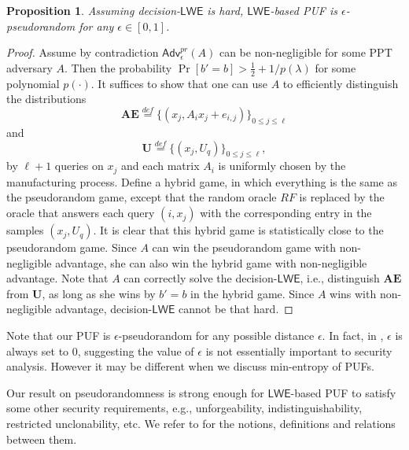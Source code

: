 \documentclass[12pt]{article}
\newcommand{\eqdef}{\stackrel{def}{=}}
\newcommand{\Adv}{\mathsf{Adv}}
\newcommand{\LWE}{\mathsf{LWE}}
\newtheorem{proposition}[theorem]{Proposition}
\theoremstyle{definition}
\begin{document}
\begin{proposition}
Assuming decision-$\LWE$ is hard, $\LWE$-based PUF is $\epsilon$-pseudorandom for any $\epsilon \in [0,1]$.
\end{proposition}
\begin{proof}
Assume by contradiction $\Adv_{\epsilon}^{pr}(A)$ can be non-negligible for some PPT adversary $A$. Then the probability $\Pr[b'=b] > \frac{1}{2} + 1/p(\lambda)$ for some polynomial $p(\cdot)$. It suffices to show that one can use $A$ to efficiently distinguish the distributions 
$$\mathbf{AE} \eqdef \{(x_j, A_ix_j+e_{i,j})\}_{0 \leq j \leq \ell}$$
and
$$\mathbf{U} \eqdef \{(x_j, U_q)\}_{0 \leq j \leq \ell},$$ 
by $\ell+1$ queries on $x_j$ and each matrix $A_i$ is uniformly chosen by the manufacturing process. 
Define a hybrid game, in which everything is the same as the pseudorandom game, except that the random oracle $RF$ is replaced by the oracle that answers each query $(i,x_j)$ with the corresponding entry in the samples $(x_j, U_q)$. It is clear that this hybrid game is statistically close to the pseudorandom game. Since $A$ can win the pseudorandom game with non-negligible advantage, she can also win the hybrid game with non-negligible advantage. Note that $A$ can correctly solve the decision-$\LWE$, i.e., distinguish $\mathbf{AE}$ from $\mathbf{U}$, as long as she wins by $b'=b$ in the hybrid game. Since $A$ wins with non-negligible advantage, decision-$\LWE$ cannot be that hard.
\end{proof}
Note that our PUF is $\epsilon$-pseudorandom for any possible distance $\epsilon$. In fact, in \cite{sadeghi2010puf}, $\epsilon$ is always set to 0, suggesting the value of $\epsilon$ is not essentially important to security analysis. However it may be different when we discuss min-entropy of PUFs.

Our result on pseudorandomness is strong enough for $\LWE$-based PUF to satisfy some other security requirements, e.g., unforgeability, indistinguishability, restricted unclonability, etc. We refer to \cite{sadeghi2016towards} for the notions, definitions and relations between them.
\end{document}
